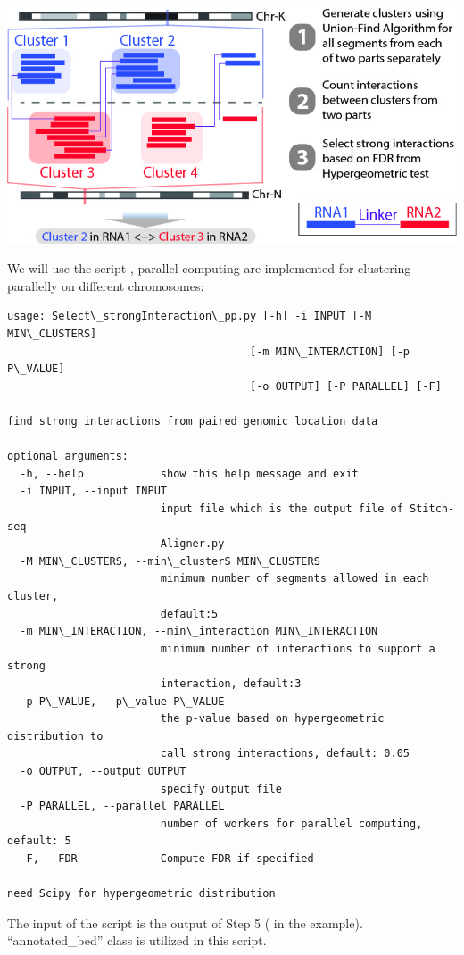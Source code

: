 \documentclass[letterpaper,10pt,english]{sphinxmanual}
\begin{document}
{\hfill\includegraphics{Find_strong_interaction.jpg}\hfill}

We will use the script , parallel computing are implemented for clustering parallelly on different chromosomes:

\begin{Verbatim}[commandchars=\\\{\}]
usage: Select\_strongInteraction\_pp.py [-h] -i INPUT [-M MIN\_CLUSTERS]
                                      [-m MIN\_INTERACTION] [-p P\_VALUE]
                                      [-o OUTPUT] [-P PARALLEL] [-F]

find strong interactions from paired genomic location data

optional arguments:
  -h, --help            show this help message and exit
  -i INPUT, --input INPUT
                        input file which is the output file of Stitch-seq-
                        Aligner.py
  -M MIN\_CLUSTERS, --min\_clusterS MIN\_CLUSTERS
                        minimum number of segments allowed in each cluster,
                        default:5
  -m MIN\_INTERACTION, --min\_interaction MIN\_INTERACTION
                        minimum number of interactions to support a strong
                        interaction, default:3
  -p P\_VALUE, --p\_value P\_VALUE
                        the p-value based on hypergeometric distribution to
                        call strong interactions, default: 0.05
  -o OUTPUT, --output OUTPUT
                        specify output file
  -P PARALLEL, --parallel PARALLEL
                        number of workers for parallel computing, default: 5
  -F, --FDR             Compute FDR if specified

need Scipy for hypergeometric distribution
\end{Verbatim}

The input of the script is the output of Step 5 ( in the example). ``annotated\_bed'' class is utilized in this script.
\end{document}
